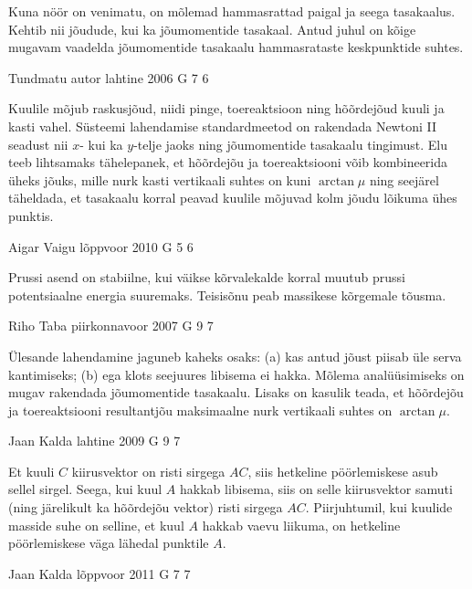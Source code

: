 \documentclass[11pt]{article}
\begin{document}
{{\ifHint
Kuna nöör on venimatu, on mõlemad hammasrattad paigal ja seega tasakaalus. Kehtib nii jõudude, kui ka jõumomentide tasakaal. Antud juhul on kõige mugavam vaadelda jõumomentide tasakaalu hammasrataste keskpunktide suhtes.
\fi
}

{Tundmatu autor} %
{lahtine} %
{2006} %
{G 7} %
{6} %
{

\ifHint
Kuulile mõjub raskusjõud, niidi pinge, toereaktsioon ning hõõrdejõud kuuli ja kasti vahel. Süsteemi lahendamise standardmeetod on rakendada Newtoni II seadust nii $x$- kui ka $y$-telje jaoks ning jõumomentide tasakaalu tingimust. Elu teeb lihtsamaks tähelepanek, et hõõrdejõu ja toereaktsiooni võib kombineerida üheks jõuks, mille nurk kasti vertikaali suhtes on kuni $\arctan\mu$ ning seejärel täheldada, et tasakaalu korral peavad kuulile mõjuvad kolm jõudu lõikuma ühes punktis.
\fi
}

{Aigar Vaigu} %
{lõppvoor} %
{2010} %
{G 5} %
{6} %
{

\ifHint
Prussi asend on stabiilne, kui väikse kõrvalekalde korral muutub prussi potentsiaalne energia suuremaks. Teisisõnu peab massikese kõrgemale tõusma.
\fi
}

{Riho Taba} %
{piirkonnavoor} %
{2007} %
{G 9} %
{7} %
{

\ifHint
Ülesande lahendamine jaguneb kaheks osaks: (a) kas antud jõust piisab üle serva kantimiseks; (b) ega klots seejuures libisema ei hakka. Mõlema analüüsimiseks on mugav rakendada jõumomentide tasakaalu. Lisaks on kasulik teada, et hõõrdejõu ja toereaktsiooni resultantjõu maksimaalne nurk vertikaali suhtes on $\arctan \mu$.
\fi
}

{Jaan Kalda} %
{lahtine} %
{2009} %
{G 9} %
{7} %
{

\ifHint
Et kuuli $C$ kiirusvektor on risti sirgega $AC$, siis hetkeline pöörlemiskese asub sellel sirgel. Seega, kui kuul $A$ hakkab libisema, siis on selle kiirusvektor samuti (ning järelikult ka hõõrdejõu vektor) risti sirgega $AC$. Piirjuhtumil, kui kuulide masside suhe on selline, et kuul $A$ hakkab vaevu liikuma, on hetkeline pöörlemiskese väga lähedal punktile $A$.
\fi
}

{Jaan Kalda} %
{lõppvoor} %
{2011} %
{G 7} %
{7} %
{

}}
\end{document}
